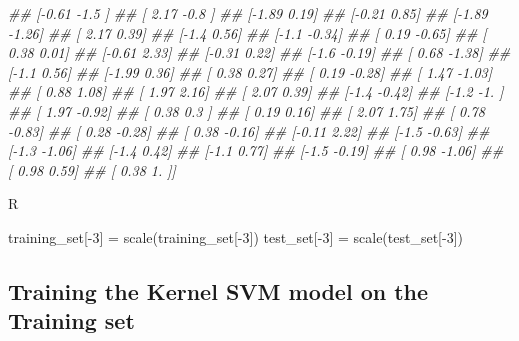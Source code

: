 \documentclass[
]{book}
\newenvironment{Shaded}{\begin{snugshade}}{\end{snugshade}}
\newcommand{\CommentTok}[1]{\textcolor[rgb]{0.56,0.35,0.01}{\textit{#1}}}
\newcommand{\DecValTok}[1]{\textcolor[rgb]{0.00,0.00,0.81}{#1}}
\newcommand{\FunctionTok}[1]{\textcolor[rgb]{0.00,0.00,0.00}{#1}}
\newcommand{\NormalTok}[1]{#1}
\newcommand{\OtherTok}[1]{\textcolor[rgb]{0.56,0.35,0.01}{#1}}
\newcommand{\SpecialCharTok}[1]{\textcolor[rgb]{0.00,0.00,0.00}{#1}}
\theoremstyle{definition}
\theoremstyle{definition}
\theoremstyle{definition}
\theoremstyle{definition}
\theoremstyle{remark}
\begin{document}
\begin{Shaded}
\begin{Highlighting}[]
\CommentTok{\#\#  [{-}0.61 {-}1.5 ]}
\CommentTok{\#\#  [ 2.17 {-}0.8 ]}
\CommentTok{\#\#  [{-}1.89  0.19]}
\CommentTok{\#\#  [{-}0.21  0.85]}
\CommentTok{\#\#  [{-}1.89 {-}1.26]}
\CommentTok{\#\#  [ 2.17  0.39]}
\CommentTok{\#\#  [{-}1.4   0.56]}
\CommentTok{\#\#  [{-}1.1  {-}0.34]}
\CommentTok{\#\#  [ 0.19 {-}0.65]}
\CommentTok{\#\#  [ 0.38  0.01]}
\CommentTok{\#\#  [{-}0.61  2.33]}
\CommentTok{\#\#  [{-}0.31  0.22]}
\CommentTok{\#\#  [{-}1.6  {-}0.19]}
\CommentTok{\#\#  [ 0.68 {-}1.38]}
\CommentTok{\#\#  [{-}1.1   0.56]}
\CommentTok{\#\#  [{-}1.99  0.36]}
\CommentTok{\#\#  [ 0.38  0.27]}
\CommentTok{\#\#  [ 0.19 {-}0.28]}
\CommentTok{\#\#  [ 1.47 {-}1.03]}
\CommentTok{\#\#  [ 0.88  1.08]}
\CommentTok{\#\#  [ 1.97  2.16]}
\CommentTok{\#\#  [ 2.07  0.39]}
\CommentTok{\#\#  [{-}1.4  {-}0.42]}
\CommentTok{\#\#  [{-}1.2  {-}1.  ]}
\CommentTok{\#\#  [ 1.97 {-}0.92]}
\CommentTok{\#\#  [ 0.38  0.3 ]}
\CommentTok{\#\#  [ 0.19  0.16]}
\CommentTok{\#\#  [ 2.07  1.75]}
\CommentTok{\#\#  [ 0.78 {-}0.83]}
\CommentTok{\#\#  [ 0.28 {-}0.28]}
\CommentTok{\#\#  [ 0.38 {-}0.16]}
\CommentTok{\#\#  [{-}0.11  2.22]}
\CommentTok{\#\#  [{-}1.5  {-}0.63]}
\CommentTok{\#\#  [{-}1.3  {-}1.06]}
\CommentTok{\#\#  [{-}1.4   0.42]}
\CommentTok{\#\#  [{-}1.1   0.77]}
\CommentTok{\#\#  [{-}1.5  {-}0.19]}
\CommentTok{\#\#  [ 0.98 {-}1.06]}
\CommentTok{\#\#  [ 0.98  0.59]}
\CommentTok{\#\#  [ 0.38  1.  ]]}
\end{Highlighting}
\end{Shaded}

R

\begin{Shaded}
\begin{Highlighting}[]
\NormalTok{training\_set[}\SpecialCharTok{{-}}\DecValTok{3}\NormalTok{] }\OtherTok{=} \FunctionTok{scale}\NormalTok{(training\_set[}\SpecialCharTok{{-}}\DecValTok{3}\NormalTok{])}
\NormalTok{test\_set[}\SpecialCharTok{{-}}\DecValTok{3}\NormalTok{] }\OtherTok{=} \FunctionTok{scale}\NormalTok{(test\_set[}\SpecialCharTok{{-}}\DecValTok{3}\NormalTok{])}
\end{Highlighting}
\end{Shaded}

\hypertarget{training-the-kernel-svm-model-on-the-training-set}{%
\subsection{Training the Kernel SVM model on the Training set}\label{training-the-kernel-svm-model-on-the-training-set}}
\end{document}
